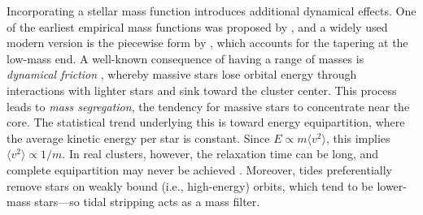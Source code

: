             Incorporating a stellar mass function introduces additional dynamical effects. One of the earliest empirical mass functions was proposed by \citet{1955ApJ...121..161S}, and a widely used modern version is the piecewise form by \citet{2001MNRAS.322..231K}, which accounts for the tapering at the low-mass end. A well-known consequence of having a range of masses is \textit{dynamical friction} \citep{1943ApJ....97..255C,1943ApJ....97..263C,1943ApJ....98...54C}, whereby massive stars lose orbital energy through interactions with lighter stars and sink toward the cluster center. This process leads to \textit{mass segregation}, the tendency for massive stars to concentrate near the core. The statistical trend underlying this is toward energy equipartition, where the average kinetic energy per star is constant. Since $E \propto m \langle v^2 \rangle$, this implies $\langle v^2 \rangle \propto 1/m$. In real clusters, however, the relaxation time can be long, and complete equipartition may never be achieved \citep{2016MNRAS.458.3644B,2025A&A...698A.209Z}. Moreover, tides preferentially remove stars on weakly bound (i.e., high-energy) orbits, which tend to be lower-mass stars—so tidal stripping acts as a mass filter.

